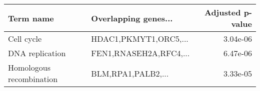 \begin{tabular}{llr}
\toprule
               Term name &   Overlapping genes... &  Adjusted p-value \\
\midrule
              Cell cycle &  HDAC1,PKMYT1,ORC5,... &          3.04e-06 \\
         DNA replication & FEN1,RNASEH2A,RFC4,... &          6.47e-06 \\
Homologous recombination &     BLM,RPA1,PALB2,... &          3.33e-05 \\
\bottomrule
\end{tabular}
